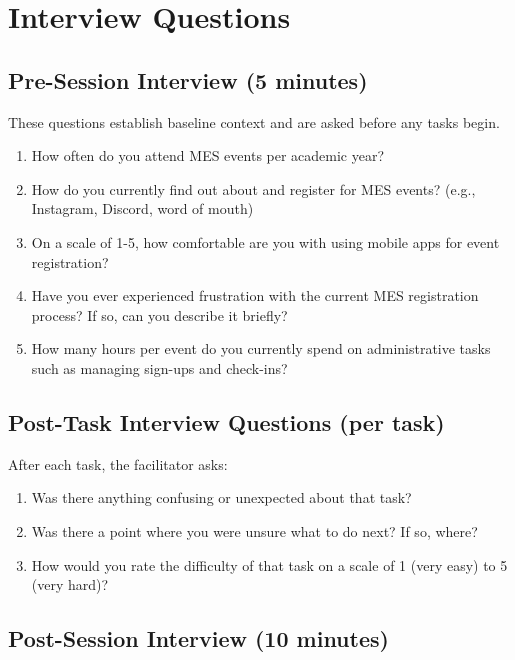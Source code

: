 \documentclass[12pt, titlepage]{article}
\begin{document}
\section{Interview Questions}


\subsection{Pre-Session Interview (5 minutes)}


These questions establish baseline context and are asked before any tasks begin.


\begin{enumerate}
    \item How often do you attend MES events per academic year?
    \item How do you currently find out about and register for MES events? (e.g., Instagram, Discord, word of mouth)
    \item On a scale of 1-5, how comfortable are you with using mobile apps for event registration?
    \item Have you ever experienced frustration with the current MES registration process? If so, can you describe it briefly?
    \item [Organizers only] How many hours per event do you currently spend on administrative tasks such as managing sign-ups and check-ins?
\end{enumerate}


\subsection{Post-Task Interview Questions (per task)}


After each task, the facilitator asks:


\begin{enumerate}
    \item Was there anything confusing or unexpected about that task?
    \item Was there a point where you were unsure what to do next? If so, where?
    \item How would you rate the difficulty of that task on a scale of 1 (very easy) to 5 (very hard)?
\end{enumerate}


\subsection{Post-Session Interview (10 minutes)}
\end{document}
